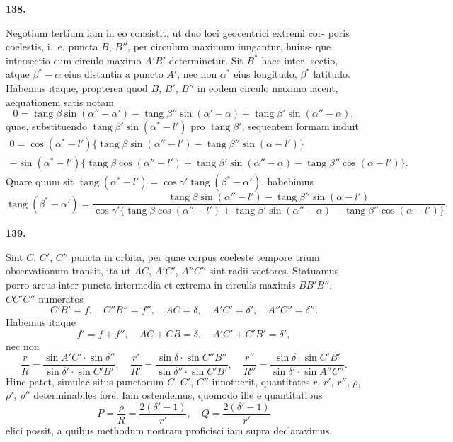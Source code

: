 \documentclass[12pt,a4paper]{article}
\DeclareMathOperator{\tang}{tang}
\begin{document}
\bigskip
\noindent\textbf{138.}

Negotium tertium iam in eo consistit, ut duo loci geocentrici extremi cor-
poris coelestis, i.~e. puncta $B$, $B''$, per circulum maximum iungantur, huius-
que intersectio cum circulo maximo $A'B'$ determinetur. Sit $B^*$ haec inter-
sectio, atque $\beta^* - \alpha$ eius distantia a puncto $A'$, nec non $\alpha^*$ eius longitudo, $\beta^*$
latitudo. Habemus itaque, propterea quod $B$, $B'$, $B''$ in eodem circulo maximo
iacent, aequationem satis notam
\[
0 = \tang\beta\sin(\alpha'' - \alpha') - \tang\beta''\sin(\alpha' - \alpha) + \tang\beta'\sin(\alpha'' - \alpha),
\]
quae, substituendo $\tang\beta'\sin(\alpha^* - l')$ pro $\tang\beta'$, sequentem formam induit
\begin{multline*}
0 = \cos(\alpha^* - l')\{\tang\beta\sin(\alpha'' - l') - \tang\beta''\sin(\alpha - l')\} \\
- \sin(\alpha^* - l')\{\tang\beta\cos(\alpha'' - l') + \tang\beta'\sin(\alpha'' - \alpha) - \tang\beta''\cos(\alpha - l')\}.
\end{multline*}
Quare quum sit $\tang(\alpha^* - l') = \cos\gamma' \tang(\beta^* - \alpha')$, habebimus
\[
\tang(\beta^* - \alpha') = \frac{\tang\beta\sin(\alpha'' - l') - \tang\beta''\sin(\alpha - l')}{\cos\gamma'\{\tang\beta\cos(\alpha'' - l') + \tang\beta'\sin(\alpha'' - \alpha) - \tang\beta''\cos(\alpha - l')\}}.
\]


\bigskip
\noindent\textbf{139.}

Sint $C$, $C'$, $C''$ puncta in orbita, per quae corpus coeleste tempore trium
observationum transit, ita ut $AC$, $A'C'$, $A''C''$ sint radii vectores. Statuamus
porro arcus inter puncta intermedia et extrema in circulis maximis $BB'B''$,
$CC'C''$ numeratos
\[
C'B' = f, \quad C''B'' = f'', \quad AC = \delta, \quad A'C' = \delta', \quad A''C'' = \delta''.
\]
Habemus itaque
\[
f' = f + f'', \quad AC + CB = \delta, \quad A'C' + C'B' = \delta',
\]
nec non
\[
\frac{r}{R} = \frac{\sin A'C'\cdot\sin\delta''}{\sin\delta'\cdot\sin C'B'}, \quad
\frac{r'}{R'} = \frac{\sin\delta\cdot\sin C''B''}{\sin\delta''\cdot\sin C'B'}, \quad
\frac{r''}{R''} = \frac{\sin\delta\cdot\sin C'B'}{\sin\delta'\cdot\sin A''C''}.
\]
Hinc patet, simulac situs punctorum $C$, $C'$, $C''$ innotuerit, quantitates $r$,
$r'$, $r''$, $\rho$, $\rho'$, $\rho''$ determinabiles fore. Iam ostendemus, quomodo ille e quantitatibus
\[
P = \frac{\rho}{R} = \frac{2(\delta'-1)}{r'}, \quad Q = \frac{2(\delta'-1)}{r'}
\]
elici possit, a quibus methodum nostram proficisci iam supra declaravimus.
\end{document}
